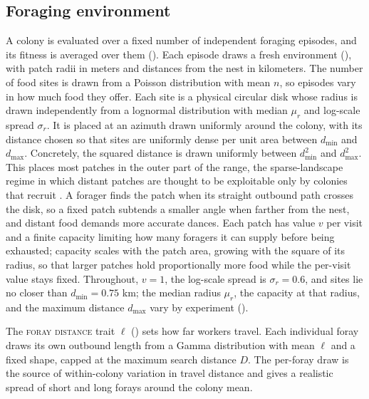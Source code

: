 \documentclass[11pt]{article}
\newcommand{\trait}[1]{\textsc{#1}}
\begin{document}
\subsection{Foraging environment}
\label{sec:environment}
A colony is evaluated over a fixed number of independent foraging episodes, and
its fitness is averaged over them (). Each episode draws a
fresh environment (), with patch radii in meters and
distances from the nest in kilometers. The number of food sites is drawn from a
Poisson distribution with mean $n$, so episodes vary in how much food they offer.
 Each site is a physical circular disk whose radius is drawn independently
from a lognormal distribution with median $\mu_r$ and log-scale spread
$\sigma_r$. It is placed at an azimuth drawn uniformly around the colony,
with its distance chosen so that sites are uniformly dense per unit area
between $d_{\min}$ and $d_{\max}$. Concretely, the squared distance is drawn
uniformly between $d_{\min}^2$ and $d_{\max}^2$. This places most patches in the
outer part of the range, the sparse-landscape regime in which distant patches are
thought to be exploitable only by colonies that recruit
\citep{beekman2000longrange}. A
forager finds the patch when its straight outbound path crosses the disk, so a
fixed patch subtends a smaller angle when farther from the nest, and distant
food demands more accurate dances. Each patch has value $v$ per visit and a finite
capacity limiting how many foragers it can supply before being exhausted;
capacity scales with the patch area, growing with the square of its radius, so
that larger patches hold proportionally more food while the per-visit value
stays fixed. Throughout, $v = 1$, the log-scale spread is $\sigma_r = 0.6$, and
sites lie no closer than $d_{\min} = 0.75$ km; the median radius $\mu_r$, the
capacity at that radius, and the maximum distance $d_{\max}$ vary by experiment
().

The \trait{foray distance} trait $\ell$ () sets how far workers travel.
Each individual foray draws its own outbound length from a Gamma distribution
with mean $\ell$ and a fixed shape, capped at the maximum search distance $D$. The
per-foray draw is the source of within-colony variation in travel distance and
gives a realistic spread of short and long forays around the colony mean.
\end{document}
